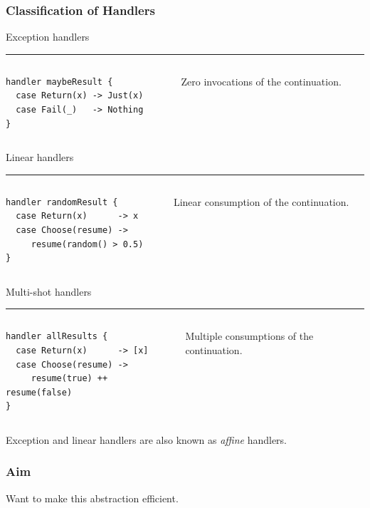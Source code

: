 \documentclass[10pt,compress]{beamer}
\begin{document}
\begin{frame}[fragile]
  \frametitle{Classification of Handlers}
Exception handlers
\hrule
\begin{columns}
\begin{column}{0.6\textwidth}
\begin{lstlisting}
handler maybeResult {
  case Return(x) -> Just(x)
  case Fail(_)   -> Nothing
}
\end{lstlisting}
\end{column}
\hfill
\begin{column}{0.4\textwidth}
Zero invocations of the continuation.
\end{column}
\end{columns}
%

Linear handlers
\hrule
\begin{columns}
\begin{column}{0.6\textwidth}
\begin{lstlisting}
handler randomResult {
  case Return(x)      -> x
  case Choose(resume) -> 
     resume(random() > 0.5)
}
\end{lstlisting}
\end{column}
\hfill
\begin{column}{0.4\textwidth}
Linear consumption of the continuation.
\end{column}
\end{columns}

Multi-shot handlers
\hrule
\begin{columns}
\begin{column}{0.6\textwidth}
\begin{lstlisting}
handler allResults {
  case Return(x)      -> [x]
  case Choose(resume) -> 
     resume(true) ++ resume(false)
}
\end{lstlisting}
\end{column}
\hfill
\begin{column}{0.4\textwidth}
Multiple consumptions of the continuation.
\end{column}
\end{columns}
Exception and linear handlers are also known as \emph{affine} handlers.
\end{frame}

\begin{frame}
  \frametitle{Aim}
Want to make this abstraction efficient.
\end{frame}
\end{document}
